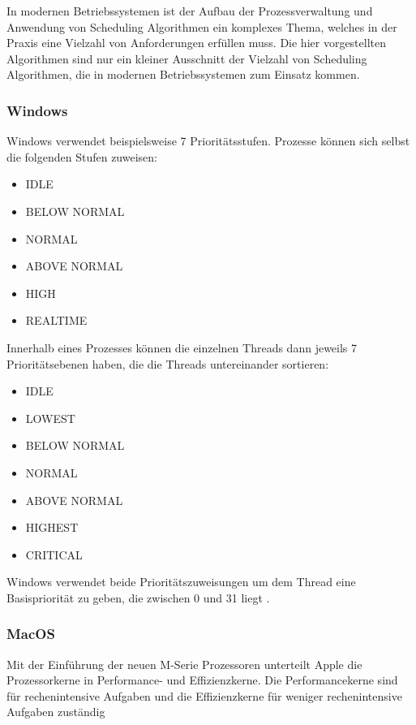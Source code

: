 
In modernen Betriebssystemen ist der Aufbau der Prozessverwaltung und Anwendung von Scheduling Algorithmen ein komplexes Thema, welches in der Praxis eine Vielzahl von Anforderungen erfüllen muss. Die hier vorgestellten Algorithmen sind nur ein kleiner Ausschnitt der Vielzahl von Scheduling Algorithmen, die in modernen Betriebssystemen zum Einsatz kommen.

\subsubsection{Windows}
Windows verwendet beispielsweise 7 Prioritätsstufen.
Prozesse können sich selbst die folgenden Stufen zuweisen:
\begin{multicols}{3}
    \begin{itemize}[noitemsep]
        \item IDLE
        \item BELOW NORMAL
        \item NORMAL
        \item ABOVE NORMAL
        \item HIGH
        \item REALTIME
    \end{itemize}
\end{multicols}

Innerhalb eines Prozesses können die einzelnen Threads dann jeweils 7 Prioritätsebenen haben, die die Threads untereinander sortieren:
\begin{multicols}{3}
    \begin{itemize}[noitemsep]
        \item IDLE
        \item LOWEST
        \item BELOW NORMAL
        \item NORMAL
        \item ABOVE NORMAL
        \item HIGHEST
        \item CRITICAL
    \end{itemize}
\end{multicols}

Windows verwendet beide Prioritätszuweisungen um dem Thread eine Basispriorität zu geben, die zwischen 0 und 31 liegt \autocite{KarlBridgeMicrosoft.2023}.

\subsubsection{MacOS}
Mit der Einführung der neuen M-Serie Prozessoren unterteilt Apple die Prozessorkerne in Performance- und Effizienzkerne. Die Performancekerne sind für rechenintensive Aufgaben und die Effizienzkerne für weniger rechenintensive Aufgaben zuständig \autocite{hoakley.2022}

